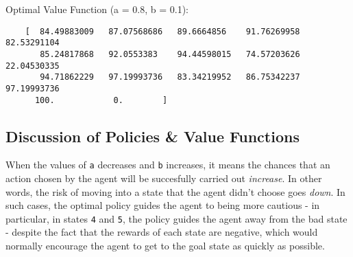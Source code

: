 \documentclass{article}
\begin{document}
  \noindent
  Optimal Value Function (a = 0.8, b = 0.1):
  \begin{verbatim}
    [  84.49883009   87.07568686   89.6664856    91.76269958   82.53291104
       85.24817868   92.0553383    94.44598015   74.57203626   22.04530335
       94.71862229   97.19993736   83.34219952   86.75342237   97.19993736
      100.            0.        ]
  \end{verbatim}

  \subsection*{Discussion of Policies \& Value Functions}

  When the values of \texttt{a} decreases and \texttt{b} increases, it means the chances that an action chosen by the
  agent will be succesfully
  carried out \textit{increase}. In other words, the risk of moving into a state that the agent didn't choose goes \textit{down}. In such
  cases, the optimal policy guides the agent to being more cautious - in particular, in states \texttt{4} and \texttt{5},
  the policy guides the agent away from the bad state - despite the fact that the rewards of each state are negative,
  which would normally encourage the agent to get to the goal state as quickly as possible.
\end{document}
